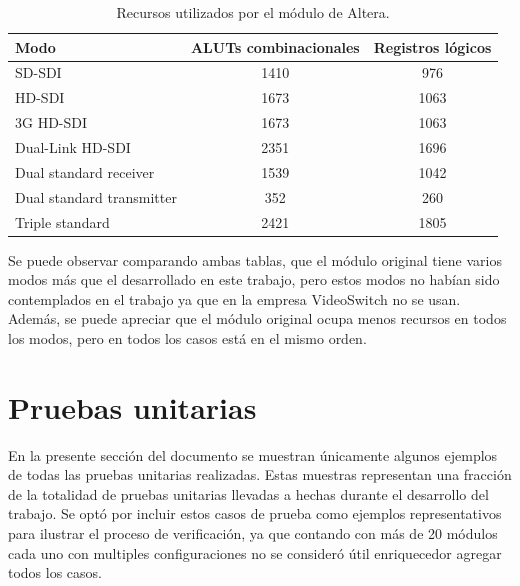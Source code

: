     \begin{table}[h]
      \centering
      \caption{Recursos utilizados por el módulo de Altera.}\label{tab:altera}
      \begin{tabular}{lcc}
        \toprule
        Modo & ALUTs combinacionales & Registros lógicos \\
        \hline
        SD-SDI & 1410 & 976 \\
        \hline
        HD-SDI & 1673 & 1063 \\
        \hline
        3G HD-SDI & 1673 & 1063 \\
        \hline
        Dual-Link HD-SDI & 2351 & 1696 \\
        \hline
        Dual standard receiver & 1539 & 1042 \\
        \hline
        Dual standard transmitter & 352 & 260 \\
        \hline
        Triple standard & 2421 & 1805 \\
        \bottomrule
        \hline
      \end{tabular}
    \end{table}

  Se puede observar comparando ambas tablas, que el módulo original tiene varios
  modos más que el desarrollado en este trabajo, pero estos modos no habían sido
  contemplados en el trabajo ya que en la empresa VideoSwitch no se usan. Además,
  se puede apreciar que el módulo original ocupa menos recursos en todos los
  modos, pero en todos los casos está en el mismo orden.


\section{Pruebas unitarias}

  En la presente sección del documento se muestran únicamente algunos ejemplos de
  todas las pruebas unitarias realizadas. Estas muestras representan una fracción
  de la totalidad de pruebas unitarias llevadas a hechas durante el desarrollo del
  trabajo. Se optó por incluir estos casos de prueba como ejemplos representativos
  para ilustrar el proceso de verificación, ya que contando con más de 20 módulos
  cada uno con multiples configuraciones no se consideró útil enriquecedor agregar
  todos los casos.

